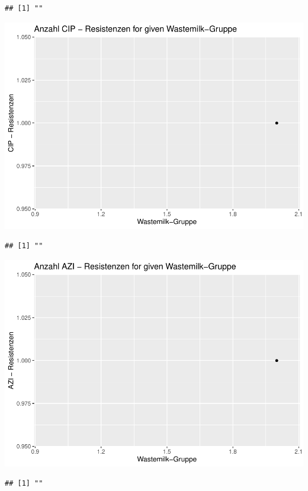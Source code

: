 \documentclass[
]{article}
\begin{document}
\begin{verbatim}
## [1] ""
\end{verbatim}

\includegraphics{NResistenzen_files/figure-latex/binary_or_nominal_variables-2.pdf}

\begin{verbatim}
## [1] ""
\end{verbatim}

\includegraphics{NResistenzen_files/figure-latex/binary_or_nominal_variables-3.pdf}

\begin{verbatim}
## [1] ""
\end{verbatim}
\end{document}
